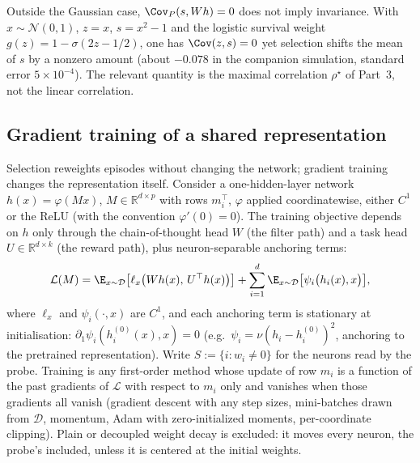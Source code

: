 \begin{remark}\label{rem:uncorrelated}
Outside the Gaussian case, $\Cov_P(s, Wh) = 0$ does not imply invariance. With $x \sim \mathcal{N}(0,1)$, $z = x$, $s = x^2 - 1$ and the logistic survival weight $g(z) = 1 - \sigma(2z - 1/2)$, one has $\Cov(z, s) = 0$ yet selection shifts the mean of $s$ by a nonzero amount (about $-0.078$ in the companion simulation, standard error $5 \times 10^{-4}$). The relevant quantity is the maximal correlation $\rho^\star$ of Part~3, not the linear correlation.
\end{remark}

\subsection{Gradient training of a shared representation}

Selection reweights episodes without changing the network; gradient training changes the representation itself. Consider a one-hidden-layer network $h(x) = \varphi(Mx)$, $M \in \mathbb{R}^{d \times p}$ with rows $m_i^\top$, $\varphi$ applied coordinatewise, either $C^1$ or the ReLU (with the convention $\varphi'(0) = 0$). The training objective depends on $h$ only through the chain-of-thought head $W$ (the filter path) and a task head $U \in \mathbb{R}^{d \times k}$ (the reward path), plus neuron-separable anchoring terms:
\begin{equation}\label{eq:train-objective}
  \mathcal{L}(M) = \E_{x \sim \mathcal{D}}\big[\ell_x\big(W h(x),\, U^\top h(x)\big)\big] + \sum_{i=1}^d \E_{x \sim \mathcal{D}}\big[\psi_i\big(h_i(x), x\big)\big],
\end{equation}
where $\ell_x$ and $\psi_i(\cdot, x)$ are $C^1$, and each anchoring term is stationary at initialisation: $\partial_1 \psi_i(h_i^{(0)}(x), x) = 0$ (e.g.\ $\psi_i = \nu (h_i - h_i^{(0)})^2$, anchoring to the pretrained representation). Write $S := \{i : w_i \neq 0\}$ for the neurons read by the probe. Training is any first-order method whose update of row $m_i$ is a function of the past gradients of $\mathcal{L}$ with respect to $m_i$ only and vanishes when those gradients all vanish (gradient descent with any step sizes, mini-batches drawn from $\mathcal{D}$, momentum, Adam with zero-initialized moments, per-coordinate clipping). Plain or decoupled weight decay is excluded: it moves every neuron, the probe's included, unless it is centered at the initial weights.

